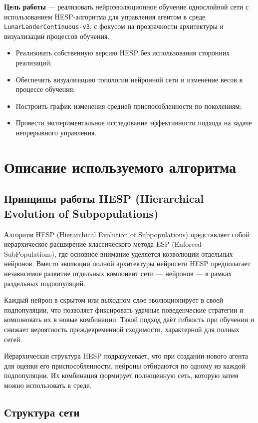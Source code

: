 \documentclass[a4paper,12pt]{article}
\begin{document}
\textbf{Цель работы} — реализовать нейроэволюционное обучение однослойной сети с использованием HESP-алгоритма для управления агентом в среде \texttt{LunarLanderContinuous-v3}, с фокусом на прозрачности архитектуры и визуализации процессов обучения.

\begin{itemize}
	\item Реализовать собственную версию HESP без использования сторонних реализаций;
	\item Обеспечить визуализацию топологии нейронной сети и изменение весов в процессе обучения;
	\item Построить график изменения средней приспособленности по поколениям;
	\item Провести экспериментальное исследование эффективности подхода на задаче непрерывного управления.
\end{itemize}


\newpage


\section{Описание используемого алгоритма}

\subsection{Принципы работы HESP (Hierarchical Evolution of Subpopulations)}

Алгоритм HESP (Hierarchical Evolution of Subpopulations) представляет собой иерархическое расширение классического метода ESP (Enforced SubPopulations), где основное внимание уделяется коэволюции отдельных нейронов. Вместо эволюции полной архитектуры нейросети HESP предполагает независимое развитие отдельных компонент сети — нейронов — в рамках раздельных подпопуляций.

Каждый нейрон в скрытом или выходном слое эволюционирует в своей подпопуляции, что позволяет фиксировать удачные поведенческие стратегии и компоновать их в новые комбинации. Такой подход даёт гибкость при обучении и снижает вероятность преждевременной сходимости, характерной для полных сетей.

Иерархическая структура HESP подразумевает, что при создании нового агента для оценки его приспособленности, нейроны отбираются по одному из каждой подпопуляции. Их комбинация формирует полноценную сеть, которую затем можно использовать в среде.

\subsection{Структура сети}
\end{document}

